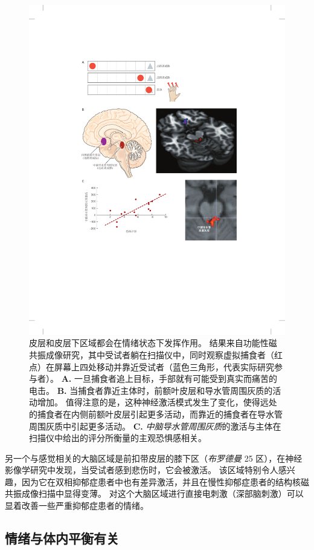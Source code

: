 \begin{figure}[htbp]
	\centering
	\includegraphics[width=0.85\linewidth]{chap42/fig_42_8}
	\caption{皮层和皮层下区域都会在情绪状态下发挥作用。
		结果来自功能性磁共振成像研究，其中受试者躺在扫描仪中，同时观察虚拟捕食者（红点）在屏幕上四处移动并靠近受试者（蓝色三角形，代表实际研究参与者）。
		\textbf{A.} 一旦捕食者追上目标，手部就有可能受到真实而痛苦的电击。
		\textbf{B.} 当捕食者靠近主体时，前额叶皮层和导水管周围灰质的活动增加。
		值得注意的是，这种神经激活模式发生了变化，使得远处的捕食者在内侧前额叶皮层引起更多活动，而靠近的捕食者在导水管周围灰质中引起更多活动。
		\textbf{C.} \textit{中脑导水管周围灰质}的激活与主体在扫描仪中给出的评分所衡量的主观恐惧感相关。}
	\label{fig:42_8}
\end{figure}


另一个与感觉相关的大脑区域是前扣带皮层的膝下区（\textit{布罗德曼} 25 区），在神经影像学研究中发现，当受试者感到悲伤时，它会被激活。
该区域特别令人感兴趣，因为它在双相抑郁症患者中也有差异激活，并且在慢性抑郁症患者的结构核磁共振成像扫描中显得变薄。
对这个大脑区域进行直接电刺激（深部脑刺激）可以显着改善一些严重抑郁症患者的情绪。



\subsection{情绪与体内平衡有关}

